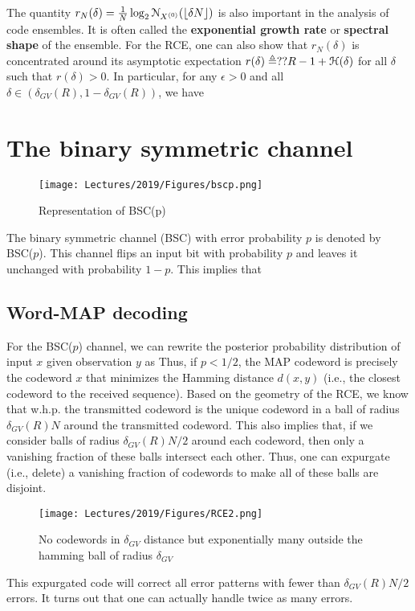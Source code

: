 \documentclass[letterpaper,english,10pt]{article}
\begin{document}
The quantity $r_N(\delta) = \frac{1}{N}\log_2\mathcal{N}_{X^{(0)}}(\lfloor\delta N\rfloor)$ is also important in the analysis of code ensembles. 
It is often called the \textbf{exponential growth rate} or \textbf{spectral shape} of the ensemble. 
For the RCE, one can also show that $r_N(\delta)$ is concentrated around its asymptotic expectation $r(\delta) \triangleq ?? R-1+\mathcal{H}(\delta)$ for all $\delta$ such that $r(\delta) > 0$. 
In particular, for any $\epsilon > 0$ and all $\delta \in (\delta_{GV}(R), 1 - \delta_{GV}(R))$, we have
\section{The binary symmetric channel}
\begin{figure}[h!]
    \centering
    \texttt{[image: Lectures/2019/Figures/bscp.png]}
    \caption{Representation of BSC(p)}
    \label{fig:my_label}
\end{figure}
\flushleft The binary symmetric channel (BSC) with error probability $p$ is denoted by BSC($p$). 
This channel flips an input bit with probability $p$ and leaves it unchanged with probability $1 - p$. 
This implies that 
\subsection{Word-MAP decoding}
For the BSC($p$) channel, we can rewrite the posterior probability distribution of input $x$ given observation $y$ as 
Thus, if $p < 1/2$, the MAP codeword is precisely the codeword $x$ that minimizes the Hamming distance $d(x, y)$ (i.e., the closest codeword to the received sequence). 
Based on the geometry of the RCE, we know that w.h.p. the transmitted codeword is the unique codeword in a ball of radius $\delta_{GV}(R)N$ around the transmitted codeword. 
This also implies that, if we consider balls of radius $\delta_{GV}(R)N/2$ around each codeword, then only a vanishing fraction of these balls intersect each other. 
Thus, one can expurgate (i.e., delete) a vanishing fraction of codewords to make all of these balls are disjoint.\begin{figure}[h!]
    \centering
    \texttt{[image: Lectures/2019/Figures/RCE2.png]}
    \caption{No codewords in $\delta_{GV}$ distance but exponentially many outside the hamming ball of radius $\delta_{GV}$ }
    \label{fig:my_label}
\end{figure}  
This expurgated code will correct all error patterns with fewer than $\delta_{GV}(R)N/2$ errors.
It turns out that one can actually handle twice as many errors. 
\end{document}
